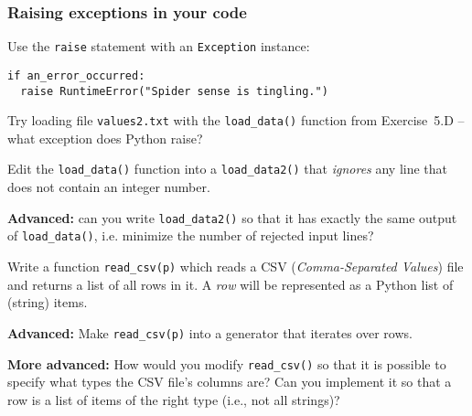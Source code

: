\documentclass[english,serif,mathserif,xcolor=pdftex,dvipsnames,table]{beamer}
\begin{document}
\begin{frame}[fragile]
  \frametitle{Raising exceptions in your code}
  Use the \lstinline|raise| statement with an \texttt{Exception}
  instance:
\begin{lstlisting}
if an_error_occurred:
  raise RuntimeError("Spider sense is tingling.")
\end{lstlisting}
\end{frame}


\begin{frame}
  \begin{exercise*}[6.A]
    Try loading file \texttt{values2.txt} with the \lstinline`load_data()`
    function from Exercise~5.D -- what exception does Python raise?

    \+
    Edit the \lstinline`load_data()` function into a \lstinline`load_data2()`
    that \emph{ignores} any line that does not contain an integer number.

    \+
    \textbf{Advanced:} can you write \lstinline`load_data2()` so that it has
    exactly the same output of \lstinline`load_data()`, i.e. minimize the number
    of rejected input lines?
  \end{exercise*}
\end{frame}

\begin{frame}
  \begin{exercise*}
    Write a function \lstinline|read_csv(p)| which reads a CSV
    (\emph{Comma-Separated Values}) file and returns a list of all
    rows in it.  A \emph{row} will be represented as a Python list of
    (string) items.

    \+ \textbf{Advanced:} Make \lstinline|read_csv(p)| into a
    generator that iterates over rows.

    \+ \textbf{More advanced:} How would you modify
    \lstinline|read_csv()| so that it is possible to specify what
    types the CSV file's columns are?  Can you implement it so that a
    row is a list of items of the right type (i.e., not all strings)?
  \end{exercise*}

\end{frame}
\end{document}
